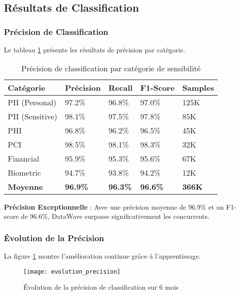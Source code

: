 \subsection{Résultats de Classification}

\subsubsection{Précision de Classification}

Le tableau \ref{tab:precision_classification} présente les résultats de précision par catégorie.

\begin{table}[htpb]
\centering
\caption{Précision de classification par catégorie de sensibilité}
\label{tab:precision_classification}
\begin{tabular}{|p{}|p{}|p{}|p{}|p{}|}
\hline
\textbf{Catégorie} & \textbf{Précision} & \textbf{Recall} & \textbf{F1-Score} & \textbf{Samples} \\
\hline
PII (Personal) & 97.2\% & 96.8\% & 97.0\% & 125K \\
\hline
PII (Sensitive) & 98.1\% & 97.5\% & 97.8\% & 85K \\
\hline
PHI & 96.8\% & 96.2\% & 96.5\% & 45K \\
\hline
PCI & 98.5\% & 98.1\% & 98.3\% & 32K \\
\hline
Financial & 95.9\% & 95.3\% & 95.6\% & 67K \\
\hline
Biometric & 94.7\% & 93.8\% & 94.2\% & 12K \\
\hline
\textbf{Moyenne} & \textbf{96.9\%} & \textbf{96.3\%} & \textbf{96.6\%} & \textbf{366K} \\
\hline
\end{tabular}
\end{table}

\textbf{Précision Exceptionnelle} : Avec une précision moyenne de 96.9\% et un F1-score de 96.6\%, DataWave surpasse significativement les concurrents.

\subsubsection{Évolution de la Précision}

La figure \ref{fig:evolution_precision} montre l'amélioration continue grâce à l'apprentissage.

\begin{figure}[htpb]
\centering
\texttt{[image: evolution\_precision]}
\caption{Évolution de la précision de classification sur 6 mois}
\label{fig:evolution_precision}
\end{figure}

